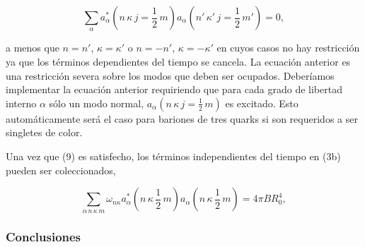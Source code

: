\begin{equation}
\sum_{\alpha} {a}_{\alpha}^{*} (n \, \kappa \, j= \frac{1}{2} \, m) {a}_{\alpha} (n' \, \kappa' \, j= \frac{1}{2} \, m') = 0,
\end{equation}

a menos que $n = n'$, $\kappa = \kappa'$ o $n = -n'$, $\kappa = -\kappa'$ en cuyos casos no hay restricción ya que los términos dependientes del tiempo se cancela. La ecuación anterior es una restricción severa sobre los modos que deben ser ocupados. Deberíamos implementar la ecuación anterior requiriendo que para cada grado de libertad interno $\alpha$ sólo un modo normal, ${a}_{\alpha}(n \, \kappa \, j = \frac{1}{2} \, m)$ es excitado. Esto automáticamente será el caso para bariones de tres quarks si son requeridos a ser singletes de color.

Una vez que (9) es satisfecho, los términos independientes del tiempo en (3b) pueden ser coleccionados,

\begin{equation}
\sum_{\alpha \, n \, \kappa \, m} {\omega}_{n \kappa} {a}_{\alpha}^{*}(n \, \kappa \, \frac{1}{2} \, m) {a}_{\alpha}(n \, \kappa \, \frac{1}{2} \, m) = 4 \pi B {R}_{0}^{4},
\end{equation}


\subsubsection*{Conclusiones}

